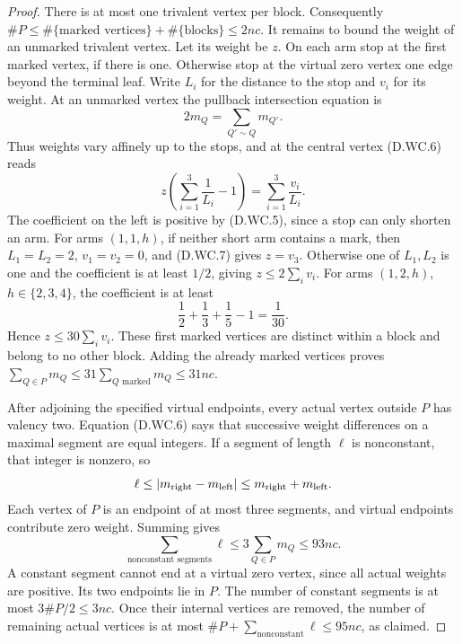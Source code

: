 \begin{proof}
There is at most one trivalent vertex per block.  Consequently
$\#P\le\#\{\text{marked vertices}\}+\#\{\text{blocks}\}\le2nc$.
It remains to bound the weight of an unmarked trivalent vertex.
Let its weight be $z$.  On each arm stop at the first marked
vertex, if there is one.  Otherwise stop at the virtual zero
vertex one edge beyond the terminal leaf.  Write $L_i$ for the
distance to the stop and $v_i$ for its weight.  At an unmarked
vertex the pullback intersection equation is
\[
                    2m_Q=\sum_{Q'\sim Q}m_{Q'}.
                                                               \tag{D.WC.6}
\]
Thus weights vary affinely up to the stops, and at the central
vertex (D.WC.6) reads
\[
             z\left(\sum_{i=1}^3\frac1{L_i}-1\right)
                       =\sum_{i=1}^3\frac{v_i}{L_i}.             \tag{D.WC.7}
\]
The coefficient on the left is positive by (D.WC.5), since a
stop can only shorten an arm.  For arms $(1,1,h)$, if neither
short arm contains a mark, then $L_1=L_2=2$, $v_1=v_2=0$, and
(D.WC.7) gives $z=v_3$.  Otherwise one of $L_1,L_2$ is one and
the coefficient is at least $1/2$, giving $z\le2\sum_i v_i$.
For arms $(1,2,h)$, $h\in\{2,3,4\}$, the coefficient is at least
\[
                         \frac12+\frac13+\frac15-1=\frac1{30}.
\]
Hence $z\le30\sum_i v_i$.  These first marked vertices are
distinct within a block and belong to no other block.  Adding
the already marked vertices proves
$\sum_{Q\in P}m_Q\le31\sum_{Q\text{ marked}}m_Q\le31nc$.

After adjoining the specified virtual endpoints, every actual
vertex outside $P$ has valency two.  Equation (D.WC.6) says that
successive weight differences on a maximal segment are equal
integers.  If a segment of length $\ell$ is nonconstant, that
integer is nonzero, so
\[
              \ell\le|m_{\rm right}-m_{\rm left}|
                         \le m_{\rm right}+m_{\rm left}.
\]
Each vertex of $P$ is an endpoint of at most three segments,
and virtual endpoints contribute zero weight.  Summing gives
\[
                \sum_{\text{nonconstant segments}}\ell
                    \le3\sum_{Q\in P}m_Q\le93nc.               \tag{D.WC.8}
\]
A constant segment cannot end at a virtual zero vertex, since
all actual weights are positive.  Its two endpoints lie in
$P$.  The number of constant segments is at most
$3\#P/2\le3nc$.  Once their internal vertices are removed, the
number of remaining actual vertices is at most
$\#P+\sum_{\text{nonconstant}}\ell\le95nc$, as claimed.
\end{proof}
